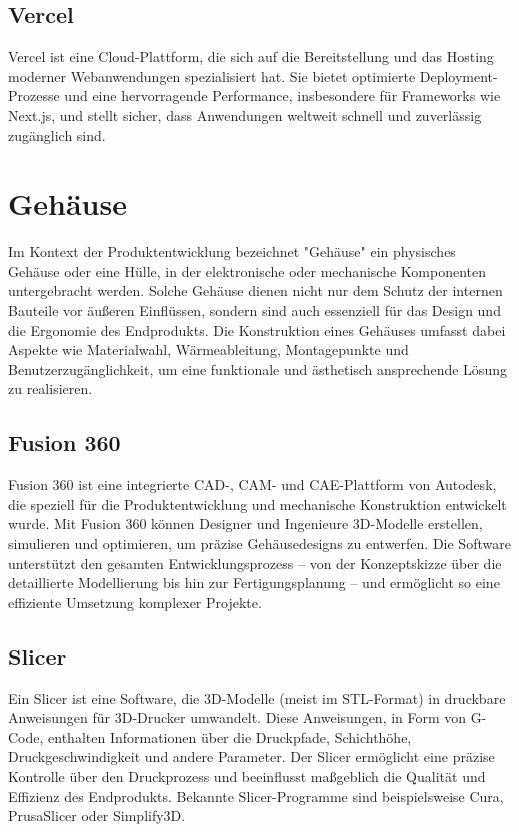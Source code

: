 \begin{inhalt}
\subsection{Vercel}
Vercel \cite{VercelWiki} ist eine Cloud-Plattform, die sich auf die Bereitstellung und das Hosting moderner Webanwendungen spezialisiert hat. Sie bietet optimierte Deployment-Prozesse und eine hervorragende Performance, insbesondere für Frameworks wie Next.js, und stellt sicher, dass Anwendungen weltweit schnell und zuverlässig zugänglich sind.

\section{Gehäuse}  
Im Kontext der Produktentwicklung bezeichnet "Gehäuse" ein physisches Gehäuse oder eine Hülle, in der elektronische oder mechanische Komponenten untergebracht werden. Solche Gehäuse dienen nicht nur dem Schutz der internen Bauteile vor äußeren Einflüssen, sondern sind auch essenziell für das Design und die Ergonomie des Endprodukts. Die Konstruktion eines Gehäuses umfasst dabei Aspekte wie Materialwahl, Wärmeableitung, Montagepunkte und Benutzerzugänglichkeit, um eine funktionale und ästhetisch ansprechende Lösung zu realisieren.

\subsection{Fusion 360}
\label{ref:fusion360_grundlagen}
Fusion 360 \cite{Fusion360Wiki} ist eine integrierte CAD-, CAM- und CAE-Plattform von Autodesk, die speziell für die Produktentwicklung und mechanische Konstruktion entwickelt wurde. Mit Fusion 360 können Designer und Ingenieure 3D-Modelle erstellen, simulieren und optimieren, um präzise Gehäusedesigns zu entwerfen. Die Software unterstützt den gesamten Entwicklungsprozess – von der Konzeptskizze über die detaillierte Modellierung bis hin zur Fertigungsplanung – und ermöglicht so eine effiziente Umsetzung komplexer Projekte.

\subsection{Slicer}

Ein Slicer \cite{SlicerWiki} ist eine Software, die 3D-Modelle (meist im STL-Format) in druckbare Anweisungen für 3D-Drucker umwandelt. Diese Anweisungen, in Form von G-Code, enthalten Informationen über die Druckpfade, Schichthöhe, Druckgeschwindigkeit und andere Parameter. Der Slicer ermöglicht eine präzise Kontrolle über den Druckprozess und beeinflusst maßgeblich die Qualität und Effizienz des Endprodukts. Bekannte Slicer-Programme sind beispielsweise Cura, PrusaSlicer oder Simplify3D.


\end{inhalt}
